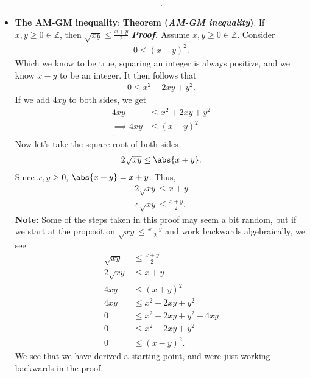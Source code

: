 \documentclass{report}
\begin{document}
\begin{itemize}
\begin{align*}
        .\end{align*}
    \item \textbf{The AM-GM inequality}:
        \bigbreak \noindent 
        \textbf{Theorem (\textit{AM-GM inequality})}. If $x,y \geq 0 \in \mathbb{Z}$, then $\sqrt{xy} \leq \frac{x+y}{2} $
        \bigbreak \noindent 
        \textbf{\textit{Proof.}} Assume $x,y \geq 0 \in \mathbb{Z}$. Consider
        \begin{align*}
            0 \leq (x-y)^{2}
        .\end{align*}
        Which we know to be true, squaring an integer is always positive, and we know $x-y$ to be an integer. It then follows that
        \begin{align*}
            0 \leq x^{2} -2xy + y^{2}
        .\end{align*}
        If we add $4xy$ to both sides, we get
        \begin{align*}
            4xy &\leq x^{2} + 2xy + y^{2} \\
            \implies 4xy &\leq (x + y)^{2} \\
        .\end{align*}
        Now let's take the square root of both sides
        \begin{align*}
            2\sqrt{xy} \leq \abs{x+y}
        .\end{align*}
        Since $x,y \geq 0$, $\abs{x+y} = x+y$. Thus,
        \begin{align*}
            2\sqrt{xy} \leq x + y \\
            \therefore \sqrt{xy} \leq \frac{x+y}{2}
        .\end{align*}
        \bigbreak \noindent 
        \textbf{Note:} Some of the steps taken in this proof may seem a bit random, but if we start at the proposition $\sqrt{xy} \leq \frac{x+y}{2}$ and work backwards algebraically, we see
        \begin{align*}
            \sqrt{xy} &\leq \frac{x+y}{2} \\
            2\sqrt{xy} &\leq x+y \\
            4xy &\leq (x+y)^{2} \\
            4xy &\leq x^{2} + 2xy + y^{2} \\
            0 &\leq x^{2} + 2xy + y^{2} - 4xy \\
            0 &\leq x^{2} - 2xy + y^{2} \\
            0 &\leq (x-y)^{2}
        .\end{align*}
        \bigbreak \noindent 
        We see that we have derived a starting point, and were just working backwards in the proof.
            
    \end{itemize}
\end{document}
